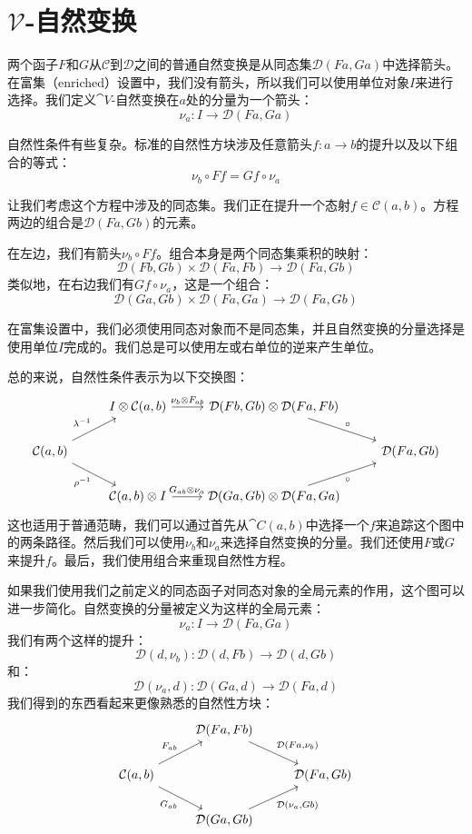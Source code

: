 \documentclass[DaoFP]{subfiles}
\begin{document}
\section{$\mathcal V$-自然变换}

两个函子$F$和$G$从$\mathcal C$到$\mathcal D$之间的普通自然变换是从同态集$\mathcal D(F a, G a)$中选择箭头。在富集（enriched）设置中，我们没有箭头，所以我们可以使用单位对象$I$来进行选择。我们定义$\cat V$-自然变换在$a$处的分量为一个箭头：
\[ \nu_a \colon I \to \mathcal D(F a, G a) \]

自然性条件有些复杂。标准的自然性方块涉及任意箭头$f \colon a \to b$的提升以及以下组合的等式：
\[ \nu_b \circ F f = G f \circ \nu_a \]

让我们考虑这个方程中涉及的同态集。我们正在提升一个态射$f \in \mathcal C(a, b)$。方程两边的组合是$\mathcal D(F a, G b)$的元素。

在左边，我们有箭头$ \nu_b \circ F f$。组合本身是两个同态集乘积的映射：
\[  \mathcal D(F b, G b) \times \mathcal D(F a, F b) \to \mathcal D(F a, G b) \]
类似地，在右边我们有$G f \circ \nu_a$，这是一个组合：
\[ \mathcal D(G a, G b) \times \mathcal D(F a, G a) \to  \mathcal D(F a, G b) \]

在富集设置中，我们必须使用同态对象而不是同态集，并且自然变换的分量选择是使用单位$I$完成的。我们总是可以使用左或右单位的逆来产生单位。

总的来说，自然性条件表示为以下交换图：
\[
 \begin{tikzcd}
 & I \otimes \mathcal C(a, b)
 \arrow[r, "\nu_b \otimes F_{a b}"]
 & \mathcal D(F b, G b) \otimes \mathcal D(F a, F b)
 \arrow[dr, "\circ"]
 \\
 \mathcal C(a, b)
 \arrow[ur, "\lambda^{-1}"]
\arrow[dr, "\rho^{-1}"']
 &&& \mathcal D(F a, G b)
 \\
 & \mathcal C(a, b) \otimes I 
 \arrow[r, "G_{a b} \otimes \nu_a"]
 & \mathcal D(G a, G b) \otimes \mathcal D(F a, G a)
 \arrow[ur, "\circ"']
  \end{tikzcd}
\]
这也适用于普通范畴，我们可以通过首先从$\cat C(a, b)$中选择一个$f$来追踪这个图中的两条路径。然后我们可以使用$\nu_b$和$\nu_a$来选择自然变换的分量。我们还使用$F$或$G$来提升$f$。最后，我们使用组合来重现自然性方程。

如果我们使用我们之前定义的同态函子对同态对象的全局元素的作用，这个图可以进一步简化。自然变换的分量被定义为这样的全局元素：
\[ \nu_a \colon I \to \mathcal D(F a, G a) \]
我们有两个这样的提升：
\[ \mathcal D(d, \nu_b) \colon \mathcal D(d, F b) \to \mathcal D(d, G b) \]
和：
\[ \mathcal D (\nu_a, d) \colon \mathcal D(G a, d) \to \mathcal D(F a, d) \]
我们得到的东西看起来更像熟悉的自然性方块：
\[
 \begin{tikzcd}
 & \mathcal D(F a, F b)
  \arrow[dr, "{\mathcal D (F a, \nu_b)}"]
 \\
 \mathcal C(a, b) 
 \arrow[ur, "F_{a b}"]
 \arrow[dr, "G_{a b}"']
 && \mathcal D(F a, G b)
 \\
& \mathcal D (G a, G b)
\arrow[ur, "{\mathcal D (\nu_a, G b)}"']
 \end{tikzcd}
\]
\end{document}
